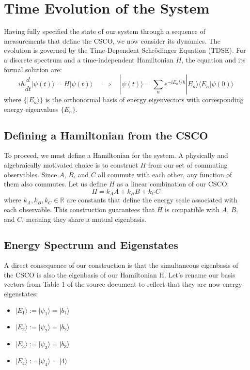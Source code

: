 \documentclass[11pt,a4paper]{article}
\begin{document}
  \section{Time Evolution of the System}

  Having fully specified the state of our system through a sequence of
  measurements that define the CSCO, we now consider its dynamics. The evolution
  is governed by the Time-Dependent Schrödinger Equation (TDSE). For a
  discrete spectrum and a time-independent Hamiltonian $H$, the equation and its
  formal solution are:
  \begin{equation*}
    i\hbar \frac{d}{dt} |\psi(t)\rangle = H |\psi(t)\rangle \quad \implies \quad
    |\psi(t)\rangle = \sum_{n} e^{-iE_nt/\hbar} |E_n\rangle \langle
    E_n|\psi(0)\rangle
  \end{equation*}
  where $\{|E_n\rangle\}$ is the orthonormal basis of energy eigenvectors with
  corresponding energy eigenvalues $\{E_n\}$.

  \subsection{Defining a Hamiltonian from the CSCO}

  To proceed, we must define a Hamiltonian for the system. A physically and
  algebraically motivated choice is to construct $H$ from our set of commuting
  observables. Since $A$, $B$, and $C$ all commute with each other, any function
  of them also commutes. Let us define $H$ as a linear combination of our
  CSCO:
  \begin{equation*}
    H = k_A A + k_B B + k_C C
  \end{equation*}
  where $k_A, k_B, k_C \in \mathbb{R}$ are constants that define the energy scale
  associated with each observable. This construction guarantees that $H$ is
  compatible with $A$, $B$, and $C$, meaning they share a mutual eigenbasis.

  \subsection{Energy Spectrum and Eigenstates}

  A direct consequence of our construction is that the simultaneous
  eigenbasis of the CSCO is also the eigenbasis of our Hamiltonian H. Let’s
  rename our basis vectors from Table 1 of the source document to reflect that
  they are now energy eigenstates:
  \begin{itemize}
    \item $|E_1\rangle := |\psi_1\rangle = |b_1\rangle$
    \item $|E_2\rangle := |\psi_2\rangle = |b_2\rangle$
    \item $|E_3\rangle := |\psi_3\rangle = |b_3\rangle$
    \item $|E_4\rangle := |\psi_4\rangle = |4\rangle$
  \end{itemize}
\end{document}
